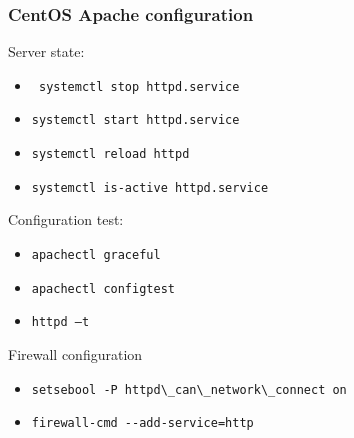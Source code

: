 \begin{frame}[fragile]
        \frametitle{CentOS Apache configuration}
Server state:
\begin{itemize}
    \item \verb| systemctl stop httpd.service|
    \item  \verb|systemctl start httpd.service|
    \item  \verb|systemctl reload httpd|
    \item  \verb|systemctl is-active httpd.service|
\end{itemize}

Configuration test:
\begin{itemize}
    \item  \verb|apachectl graceful|
    \item  \verb|apachectl configtest|
    \item  \verb|httpd –t |
\end{itemize}
Firewall configuration
\begin{itemize}
    \item  \verb|setsebool -P httpd\_can\_network\_connect on|
    \item  \verb|firewall-cmd --add-service=http|
\end{itemize}

\end{frame}

